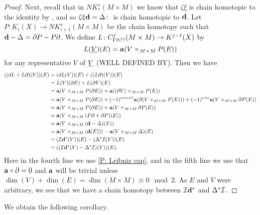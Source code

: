 \documentclass{amsart}
\begin{document}
\begin{proof}
	Next, recall that in $NK^s_*(M \times M)$ we know that $\zeta \xi$ is chain homotopic to the identity by \cite[Section XI.5]{Mas91}, and so $\zeta\xi \mathbf{d} = \Delta \colon $ is chain homotopic to $\mathbf{d}$.
	Let $P \colon K_i(X) \to NK^s_{i+1}(M \times M)$ be the chain homotopy such that $\mathbf{d} - \Delta = \partial P - P \partial$.
	We define $L \colon C^j_{\Gamma \pitchfork ??}(M \times M) \to K^{j-1}(X)$ by $$L(\underline{V})(E) = \mathbf{a}(V \times_{M \times M} P(E))$$
	for any representative $V$ of $\underline{V}$ (WELL DEFINED BY).
	Then we have
	\begin{align*}
		((dL + L\partial)(V))(E) &=(dL(V))(E) + ((L\partial)(V))(E) \\
			& = L(V)(\partial E) +L(\partial V)(E)\\
			& = \mathbf{a}(V \times_{M \times M} P(\partial E)) + \mathbf{a}((\partial V) \times_{M \times M} P(E))\\
			& = \mathbf{a}(V \times_{M \times M} P(\partial E)) + (-1)^{v+e+1}\mathbf{a}(\partial(V \times_{M \times M} P(E)))+(-1)^{v+e}\mathbf{a}(V \times_{M \times M} \partial P(E))\\
			&=\mathbf{a}(V \times_{M \times M} P(\partial E)) +\mathbf{a}(V \times_{M \times M} \partial P(E))\\
			&=\mathbf{a}(V \times_{M \times M} (P\partial + \partial P)(E))\\
			&=\mathbf{a}(V \times_{M \times M} (\mathbf{d} - \Delta)(E))\\
			&=\mathbf{a}(V \times_{M \times M} (\mathbf{d}(E))) - \mathbf{a}(V \times_{M \times M} \Delta)(E)\\
			&=(\mathcal{I} \mathbf{d}^*(V))(E)- 	(\Delta^*\mathcal{I}(V))(E)\\
			&=((\mathcal{I} \mathbf{d}^*(V)- \Delta^*\mathcal{I})(V))(E).
	\end{align*}
	Here in the fourth line we use \cref{P: Leibniz cap}, and in the fifth line we use that $\mathbf{a} \circ \partial =0$  and $\mathbf{a}$ will be trivial unless $\dim(V)+ \dim(E) = \dim(M \times M) \equiv 0 \mod 2$.
	As $E$ and $V$ were arbitrary, we see that we have a chain homotopy between $\mathcal{I} \mathbf{d}^*$ and $\Delta^*\mathcal{I}$.
\end{proof}

We obtain the following corollary.
\end{document}
